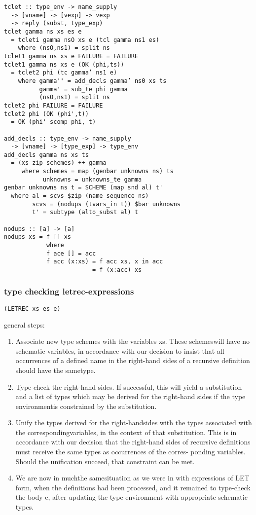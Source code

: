 \documentclass[8pt]{extarticle}
\begin{document}
\begin{multicols*}{2}
\begin{verbatim}
tclet :: type_env -> name_supply
  -> [vname] -> [vexp] -> vexp
  -> reply (subst, type_exp)
tclet gamma ns xs es e
  = tcleti gamma nsO xs e (tcl gamma ns1 es)
    where (nsO,ns1) = split ns
tclet1 gamma ns xs e FAILURE = FAILURE
tclet1 gamma ns xs e (OK (phi,ts))
  = tclet2 phi (tc gamma’ ns1 e)
    where gamma'' = add_decls gamma’ ns0 xs ts
          gamma' = sub_te phi gamma
          (nsO,ns1) = split ns
tclet2 phi FAILURE = FAILURE
tclet2 phi (OK (phi',t))
  = OK (phi' scomp phi, t)

add_decls :: type_env -> name_supply
  -> [vname] -> [type_exp] -> type_env
add_decls gamma ns xs ts
  = (xs zip schemes) ++ gamma
     where schemes = map (genbar unknowns ns) ts
           unknowns = unknowns_te gamma
genbar unknowns ns t = SCHEME (map snd al) t'
  where al = scvs $zip (name_sequence ns)
        scvs = (nodups (tvars_in t)) $bar unknowns
        t' = subtype (alto_subst al) t

nodups :: [a] -> [a]
nodups xs = f [] xs
            where
            f ace [] = acc
            f acc (x:xs) = f acc xs, x in acc
                         = f (x:acc) xs
\end{verbatim}

\subsubsection{type checking letrec-expressions}

\verb|(LETREC xs es e)|

general steps:
\begin{enumerate}
\item Associate new type schemes with the variables xs. These schemeswill
have no schematic variables, in accordance with our decision to insist
that all occurrences of a defined name in the right-hand sides of a
recursive definition should have the sametype.
\item Type-check the right-hand sides. If successful, this will yield a
substitution and a list of types which may be derived for the right-hand
sides if the type environmentis constrained by the substitution.
\item Unify the types derived for the right-handsides with the types associated
with the correspondingvariables, in the context of that substitution. This
is in accordance with our decision that the right-hand sides of recursive
definitions must receive the same types as occurrences of the corres-
ponding variables. Should the unification succeed, that constraint can be
met.
\item We are now in muchthe samesituation as we were in with expressions of
LET form, when the definitions had been processed, and it remained to
type-check the body e, after updating the type environment with
appropriate schematic types.
\end{enumerate}


\end{multicols*}
\end{document}
